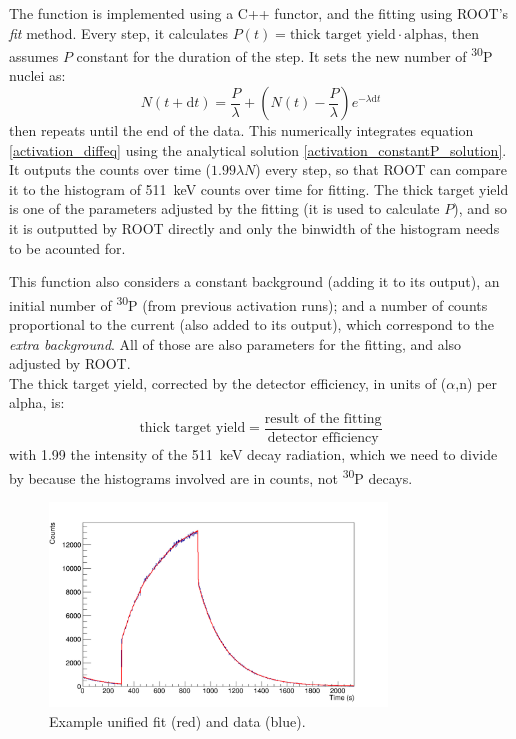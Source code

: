 \documentclass[a4paper,12pt]{report}
\newcommand{\dif}{\text{d}}
\newcommand{\an}{($\alpha$,n) }
\newcommand{\Piso}{\textsuperscript{30}P }
\begin{document}
The function is implemented using a C++ functor, and the fitting using ROOT's \textit{fit} method.
Every step, it calculates $P(t)=\text{thick target yield}\cdot\text{alphas}$, then assumes $P$ constant for the duration of the step.
It sets the new number of \Piso nuclei as:
\begin{equation}
	N(t+\dif t)=\frac{P}{\lambda} + \left( N(t)-\frac{P}{\lambda} \right) e^{-\lambda \dif t}
\end{equation}
then repeats until the end of the data.
This numerically integrates equation \ref{activation_diffeq} using the analytical solution \ref{activation_constantP_solution}.
It outputs the counts over time ($1.99 \lambda N$) every step, so that ROOT can compare it to the histogram of \qty{511}{\keV} counts over time for fitting.
The thick target yield is one of the parameters adjusted by the fitting (it is used to calculate $P$), and so it is outputted by ROOT directly and only the binwidth of the histogram needs to be acounted for.

This function also considers a constant background (adding it to its output), an initial number of \Piso (from previous activation runs); and a number of counts proportional to the current (also added to its output), which correspond to the \textit{extra background}.
All of those are also parameters for the fitting, and also adjusted by ROOT.
\\

The thick target yield, corrected by the detector efficiency, in units of \an per alpha, is:
\begin{equation}
	\text{thick target yield} = \frac{\text{result of the fitting}}{\text{detector efficiency}}
\end{equation}
with \num{1.99} the intensity of the \qty{511}{\keV} decay radiation, which we need to divide by because the histograms involved are in counts, not \Piso decays.

\begin{figure}[H]
	\centering
	\includegraphics[width=0.80\textwidth]{example_unified_fit.png}
	\caption{Example unified fit (red) and data (blue).}
	\label{example_unified_fit}
\end{figure}
\end{document}
